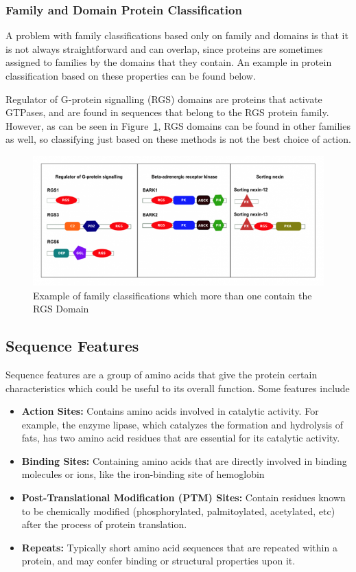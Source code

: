 \documentclass{article}
\begin{document}
\subsubsection*{Family and Domain Protein Classification}

A problem with family classifications based only on family and domains is that it is not always straightforward and can overlap, since proteins are sometimes assigned to families by the domains that they contain. An example in protein classification based on these properties can be found below.

Regulator of G-protein signalling (RGS) domains are proteins that activate GTPases, and are found in sequences that belong to the RGS protein family. However, as can be seen in Figure~\ref{fig:RGSSort}, RGS domains can be found in other families as well, so classifying just based on these methods is not the best choice of action.

\begin{figure}[h!]
\centering
\includegraphics[width=.75\textwidth]{RGSSort.png}
\caption{Example of family classifications which more than one contain the RGS Domain \cite{EBI}}
\label{fig:RGSSort}
\end{figure}

\subsection*{Sequence Features}

Sequence features are a group of amino acids that give the protein certain characteristics which could be useful to its overall function. Some features include

\begin{itemize}
\item {\bf Action Sites:} Contains amino acids involved in catalytic activity. For example, the enzyme lipase, which catalyzes the formation and hydrolysis of fats, has two amino acid residues that are essential for its catalytic activity.
\item {\bf Binding Sites:} Containing amino acids that are directly involved in binding molecules or ions, like the iron-binding site of hemoglobin
\item {\bf Post-Translational Modification (PTM) Sites:} Contain residues known to be chemically modified (phosphorylated, palmitoylated, acetylated, etc) after the process of protein translation.
\item {\bf Repeats:} Typically short amino acid sequences that are repeated within a protein, and may confer binding or structural properties upon it.
\end{itemize}
\end{document}
